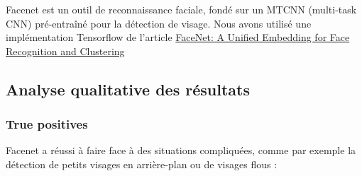\documentclass[a4paper,11pt]{article}
\begin{document}
Facenet est un outil de reconnaissance faciale, fondé sur un MTCNN (multi-task CNN) pré-entraîné pour la détection de visage. Nous avons utilisé une implémentation Tensorflow de l'article \href{https://arxiv.org/abs/1503.03832}{FaceNet: A Unified Embedding for Face Recognition and Clustering}

\subsection{Analyse qualitative des résultats}
\subsubsection{True positives}

Facenet a réussi à faire face à des situations compliquées, comme par exemple la détection de petits visages en arrière-plan ou de visages flous :
\end{document}
